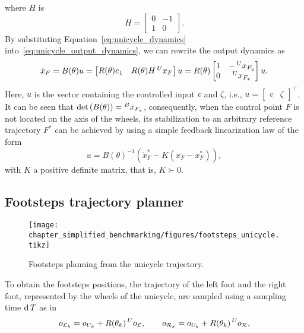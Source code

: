 where $H$ is
\[
H= \begin{bmatrix}
  0 & -1 \\
  1 & 0
\end{bmatrix}.
\]
By substituting Equation~\eqref{eq:unicycle_dynamics} into~\eqref{eq:unicycle_output_dynamics}, we can rewrite the output dynamics as
\begin{equation}
    \dot{x}_F = B(\theta) u = \begin{bmatrix} R(\theta) e_1 & R(\theta) H  \prescript{U}{}{x}_F \end{bmatrix} u = R(\theta)
\begin{bmatrix}
  1 & -\prescript{U}{}{x}_{F_y}\\
  0 & \prescript{U}{}{x}_{F_x}
\end{bmatrix} u.
\end{equation}
Here, $u$ is the vector containing the controlled input $v$ and $\zeta$, i.e.,  $u = \begin{bmatrix} v & \zeta \end{bmatrix}^\top$. It can be seen that $\det\left(B(\theta)\right) = \prescript{B}{}{x}_{F_x}$, consequently, when the control point $F$ is not located on the axis of the wheels, its stabilization to an arbitrary reference trajectory $F^*$ can be achieved by using a simple feedback linearization law of the form
\begin{equation}
  \label{eq:unicycle_control_law}
 u  = B(\theta)^{-1} ({\dot{{x}}}_{F}^* - K ( x_F - x_F^* )),
\end{equation}
with $K$ a positive definite matrix, that is, $K \succ 0$.

\subsection{Footsteps trajectory planner
\label{sec:footsteps_trajectory}}
\begin{figure}[!t]
  \centering
  \texttt{[image: chapter\_simplified\_benchmarking/figures/footsteps\_unicycle.tikz]}
  \caption{Footsteps planning from the unicycle trajectory.\label{fig:footsteps_unicycle}}
\end{figure}
To obtain the footsteps positions, the trajectory of the left foot and the right foot,
represented by the wheels of the unicycle, are sampled using a sampling time $\operatorname{d} T$ as in~\citep{8594277}
\begin{equation}
    {{o}}_{\mathcal{L}_k} = {{o}}_{U_k} + R(\theta_k) \prescript{U}{}{{o}}_\mathcal{L},
\quad \quad
{{o}}_{\mathcal{R}_k} = {{o}}_{U_k} + R(\theta_k) \prescript{U}{}{{o}}_\mathcal{R},
\end{equation}

